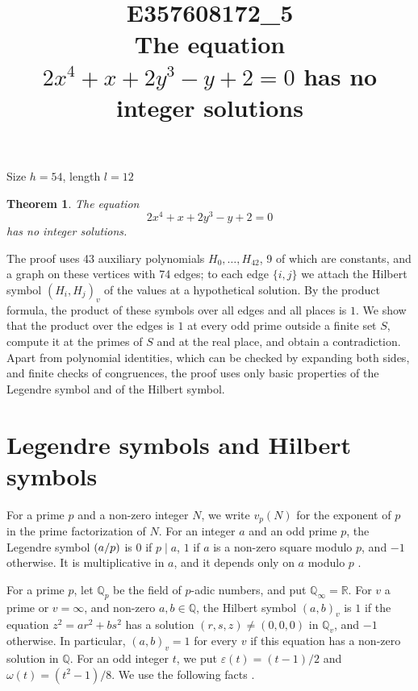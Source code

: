 \documentclass[11pt]{article}
\title{\textbf{E357608172\_5}\\[4pt] {\Large The equation $2x^{4}+x+2y^{3}-y+2=0$ has no integer solutions}}
\author{}
\date{}
\newtheorem{theorem}{Theorem}
\newcommand{\Q}{\mathbb{Q}}
\newcommand{\leg}[2]{\mathchoice{\biggl(\dfrac{#1}{#2}\biggr)}{(#1/#2)}{(#1/#2)}{(#1/#2)}}
\begin{document}
\maketitle
\vspace{-8ex}
\begin{center}
Size $h=54$, length $l=12$
\end{center}

\begin{theorem}\label{thm:main}
The equation
\begin{equation}\label{eq:main}
2x^{4}+x+2y^{3}-y+2=0
\end{equation}
has no integer solutions.
\end{theorem}

The proof uses 43 auxiliary polynomials $H_0,\dots,H_{42}$, 9 of which are constants, and a graph on these vertices with 74 edges; to each edge $\{i,j\}$ we attach the Hilbert symbol $(H_i,H_j)_v$ of the values at a hypothetical solution. By the product formula, the product of these symbols over all edges and all places is $1$. We show that the product over the edges is $1$ at every odd prime outside a finite set $S$, compute it at the primes of $S$ and at the real place, and obtain a contradiction. Apart from polynomial identities, which can be checked by expanding both sides, and finite checks of congruences, the proof uses only basic properties of the Legendre symbol and of the Hilbert symbol.

\section{Legendre symbols and Hilbert symbols}

For a prime $p$ and a non-zero integer $N$, we write $v_p(N)$ for the exponent of $p$ in the prime factorization of $N$. For an integer $a$ and an odd prime $p$, the Legendre symbol $\leg{a}{p}$ is $0$ if $p\mid a$, $1$ if $a$ is a non-zero square modulo $p$, and $-1$ otherwise. It is multiplicative in $a$, and it depends only on $a$ modulo $p$ \cite[Chapter~5]{IR}.

For a prime $p$, let $\Q_p$ be the field of $p$-adic numbers, and put $\Q_\infty=\mathbb R$. For $v$ a prime or $v=\infty$, and non-zero $a,b\in\Q$, the Hilbert symbol $(a,b)_v$ is $1$ if the equation $z^2=ar^2+bs^2$ has a solution $(r,s,z)\neq(0,0,0)$ in $\Q_v$, and $-1$ otherwise. In particular, $(a,b)_v=1$ for every $v$ if this equation has a non-zero solution in $\Q$. For an odd integer $t$, we put $\varepsilon(t)=(t-1)/2$ and $\omega(t)=(t^2-1)/8$. We use the following facts \cite[Chapter~III, Proposition~2 and Theorems~1 and~3]{Se}.
\end{document}
